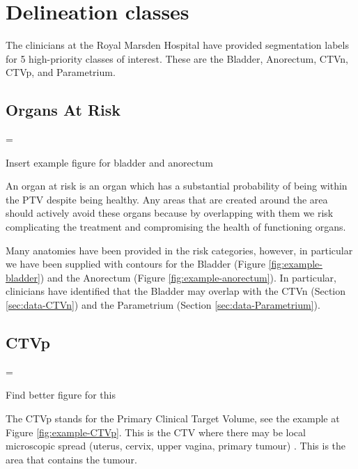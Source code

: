 \documentclass[11pt,twoside]{report}
\newenvironment{warning}
  {\par\begin{mdframed}[linewidth=1pt,linecolor=black]%
    \begin{list}{}{\leftmargin=1cm
                   \labelwidth=\leftmargin}\item[\Large\ding{43}]}
  {\end{list}\end{mdframed}\par}
\begin{document}
\section{Delineation classes}\label{sec:data-delineation-classes}

The clinicians at the Royal Marsden Hospital have provided segmentation labels for 5 high-priority classes of interest. These are the Bladder, Anorectum, CTVn, CTVp, and Parametrium. 

\subsection{Organs At Risk}\label{sec:data-organs-at-risk}

\begin{warning}
  Insert example figure for bladder and anorectum
\end{warning}

An organ at risk is an organ which has a substantial probability of being within the PTV despite being healthy. Any areas that are created around the area should actively avoid these organs because by overlapping with them we risk complicating the treatment and compromising the health of functioning organs.

Many anatomies have been provided in the risk categories, however, in particular we have been supplied with contours for the Bladder (Figure \ref{fig:example-bladder}) and the Anorectum (Figure \ref{fig:example-anorectum}). In particular, clinicians have identified that the Bladder may overlap with the CTVn (Section \ref{sec:data-CTVn}) and the Parametrium (Section \ref{sec:data-Parametrium}). 

\subsection{CTVp}\label{sec:data-CTVp}

\begin{warning}
  Find better figure for this
\end{warning}


The CTVp stands for the Primary Clinical Target Volume, see the example at Figure \ref{fig:example-CTVp}. This is the CTV where there may be local microscopic spread (uterus, cervix, upper vagina, primary tumour) \cite{AMLART-data}. This is the area that contains the tumour.
\end{document}
